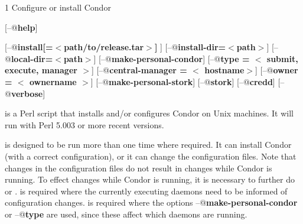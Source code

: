 \begin{ManPage}{\label{man-condor-configure}}{1}
{Configure or install Condor}

\Synopsis {}
[\verb@--@\textbf{help}]

[\verb@--@\textbf{install[=$<$path/to/release.tar$>$] }]
[\verb@--@\textbf{install-dir=$<$path$>$}]
[\verb@--@\textbf{local-dir=$<$path$>$}]
[\verb@--@\textbf{make-personal-condor}]
[\verb@--@\textbf{type = $<$ submit, execute, manager $>$}]
[\verb@--@\textbf{central-manager = $<$ hostname$>$}]
[\verb@--@\textbf{owner = $<$ ownername $>$}]
[\verb@--@\textbf{make-personal-stork}]
[\verb@--@\textbf{stork}]
[\verb@--@\textbf{credd}]
[\verb@--@\textbf{verbose}]






\Description 

 is a Perl script that installs and/or configures
Condor on Unix machines.
It will run with Perl 5.003 or more recent versions.

 is designed to be run more than one time
where required.
It can install Condor (with a correct configuration),
or it can change the configuration files.
Note that changes in the configuration files do not result
in changes while Condor is running.
To effect changes while Condor is running,
it is necessary to further do  or .
  is required where the currently executing
daemons need to be informed of configuration changes.
 is required where the options
\verb@--@\textbf{make-personal-condor} or
\verb@--@\textbf{type}
are used, since these affect which daemons are running.


\end{ManPage}
